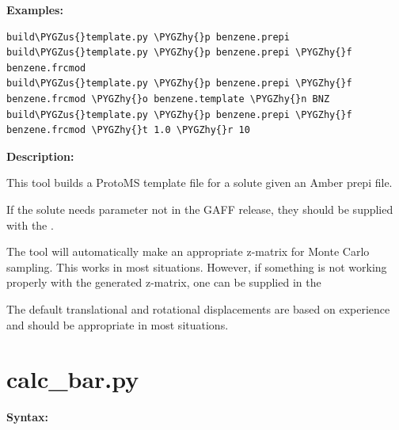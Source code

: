 \documentclass[letterpaper,10pt,english]{sphinxmanual}
\def\PYGZus{\char`\_}
\def\PYGZhy{\char`\-}
\begin{document}
\textbf{Examples:}

\begin{Verbatim}[commandchars=\\\{\}]
build\PYGZus{}template.py \PYGZhy{}p benzene.prepi
build\PYGZus{}template.py \PYGZhy{}p benzene.prepi \PYGZhy{}f benzene.frcmod
build\PYGZus{}template.py \PYGZhy{}p benzene.prepi \PYGZhy{}f benzene.frcmod \PYGZhy{}o benzene.template \PYGZhy{}n BNZ
build\PYGZus{}template.py \PYGZhy{}p benzene.prepi \PYGZhy{}f benzene.frcmod \PYGZhy{}t 1.0 \PYGZhy{}r 10
\end{Verbatim}

\textbf{Description:}

This tool builds a ProtoMS template file for a solute given an Amber prepi file.

If the solute needs parameter not in the GAFF release, they should be supplied with the .

The tool will automatically make an appropriate z-matrix for Monte Carlo sampling. This works in most situations. However, if something is not working properly with the generated z-matrix, one can be supplied in the 

The default translational and rotational displacements are based on experience and should be appropriate in most situations.


\section{calc\_bar.py}
\label{tools:calc-bar-py}
\textbf{Syntax:}
\end{document}
